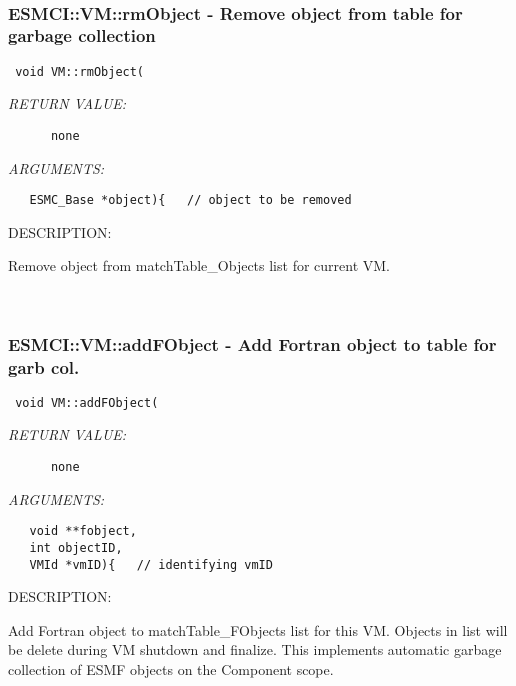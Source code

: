 {\mbox{}\hrulefill\
 
\subsubsection [ESMCI::VM::rmObject] {ESMCI::VM::rmObject - Remove object from table for garbage collection}


  
\begin{verbatim} void VM::rmObject(\end{verbatim}{\em RETURN VALUE:}
\begin{verbatim}      none\end{verbatim}{\em ARGUMENTS:}
\begin{verbatim}   ESMC_Base *object){   // object to be removed\end{verbatim}
{\sf DESCRIPTION:\\ }


      Remove object from matchTable_Objects list for current VM.
   
 
\mbox{}\hrulefill\
 
\subsubsection [ESMCI::VM::addFObject] {ESMCI::VM::addFObject - Add Fortran object to table for garb col.}


  
\begin{verbatim} void VM::addFObject(\end{verbatim}{\em RETURN VALUE:}
\begin{verbatim}      none\end{verbatim}{\em ARGUMENTS:}
\begin{verbatim}   void **fobject,
   int objectID,
   VMId *vmID){   // identifying vmID\end{verbatim}
{\sf DESCRIPTION:\\ }


      Add Fortran object to matchTable_FObjects list for this VM. Objects in
      list will be delete during VM shutdown and finalize. This implements
      automatic garbage collection of ESMF objects on the Component scope.
   
 
\mbox{}\hrulefill\
 
}
